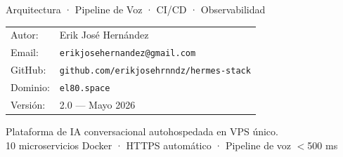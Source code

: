 \documentclass[12pt,a4paper,openany]{book}
\begin{document}
\begin{titlepage}
  \pagecolor{hermesdark}
  \color{white}
  \centering
  \vspace*{3cm}


  \vspace{1.5cm}
  {\sffamily\large Arquitectura · Pipeline de Voz · CI/CD · Observabilidad}

  \vspace{2cm}
  \begin{tabular}{ll}
    \textsf{Autor:}   & Erik José Hernández \\[4pt]
    \textsf{Email:}   & \texttt{erikjosehernandez@gmail.com} \\[4pt]
    \textsf{GitHub:}  & \texttt{github.com/erikjosehrnndz/hermes-stack} \\[4pt]
    \textsf{Dominio:} & \texttt{el80.space} \\[4pt]
    \textsf{Versión:} & 2.0 — Mayo 2026 \\
  \end{tabular}

  \vfill
  {\small\color{white!60}
    Plataforma de IA conversacional autohospedada en VPS único.\\
    10 microservicios Docker · HTTPS automático · Pipeline de voz $<$500 ms
  }
\end{titlepage}
\nopagecolor

\frontmatter
\tableofcontents
\listoftables
\mainmatter





\end{document}
